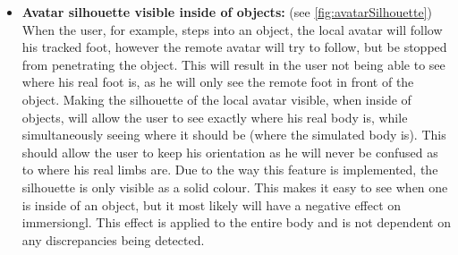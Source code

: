\begin{itemize}
    
    \item \textbf{Avatar silhouette visible inside of objects:} (see \autoref{fig:avatarSilhouette})
    \newline
    When the user, for example, steps into an object, the local avatar will follow his tracked foot, however the remote avatar will try to follow, but be stopped from penetrating the object. This will result in the user not being able to see where his real foot is, as he will only see the remote foot in front of the object. Making the silhouette of the local avatar visible, when inside of objects, will allow the user to see exactly where his real body is, while simultaneously seeing where it should be (where the simulated body is).
    \newline
    This should allow the user to keep his orientation as he will never be confused as to where his real limbs are. Due to the way this feature is implemented, the silhouette is only visible as a solid colour. This makes it easy to see when one is inside of an object, but it most likely will have a negative effect on \gls{immersiongl}.
    \newline
    This effect is applied to the entire body and is not dependent on any discrepancies being detected.
    

\end{itemize}
